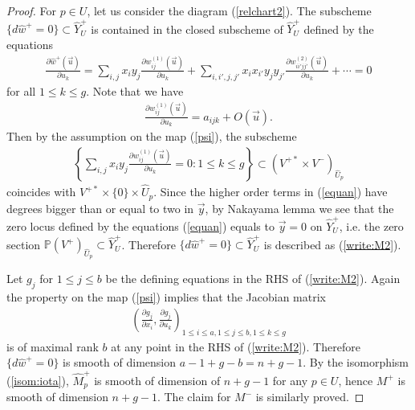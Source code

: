 \documentclass[11pt]{amsart}
\theoremstyle{plain}
\begin{document}
\begin{proof}
For $p\in U$, let us consider the diagram 
(\ref{relchart2}). 
The subscheme $\{d\widehat{w}^+=0\} \subset \widehat{Y}_U^+$
is contained in the closed subscheme of $\widehat{Y}_U^+$
defined by the equations
\begin{align}\label{equan}
\frac{\partial \widehat{w}^+(\vec{u})}{\partial u_k}
=\sum_{i, j}x_i y_j 
\frac{\partial w_{ij}^{(1)}(\vec{u})}{\partial u_k}+
\sum_{i, i', j, j'}x_i x_{i'} y_j y_{j'}
\frac{\partial w_{ii'jj'}^{(2)}(\vec{u})}{\partial u_k}
+ \cdots =0
\end{align}
for all $1\le k\le g$. 
Note that we have 
\begin{align*}
\frac{\partial w_{ij}^{(1)}(\vec{u})}{\partial u_k}
=a_{ijk} +O(\vec{u}).
\end{align*}
Then 
by the assumption on the map (\ref{psi}),
the subscheme
\begin{align*}
\left\{ \sum_{i, j}x_i y_j 
\frac{\partial w_{ij}^{(1)}(\vec{u})}{\partial u_k}=0 : 
1\le k\le g  \right\}
\subset (V^{+\ast} \times V^-)_{\widehat{U}_p}
\end{align*} 
coincides with $V^{+\ast} \times \{0\} \times \widehat{U}_p$. 
Since the higher order terms in (\ref{equan})
have degrees bigger than or equal to two in
$\vec{y}$, 
by Nakayama lemma
we see that 
the zero locus defined by the equations (\ref{equan})
equals to 
$\vec{y}=0$ on $\widehat{Y}_{U}^+$, i.e. 
the zero section 
$\mathbb{P}(V^+)_{\widehat{U}_p} \subset \widehat{Y}_{U}^+$. 
Therefore 
$\{d\widehat{w}^+=0\} \subset \widehat{Y}_U^+$ is 
described as (\ref{write:M2}). 

Let $g_j$ for $1\le j\le b$ be the defining 
equations in the RHS of (\ref{write:M2}). 
Again the property on the map (\ref{psi}) implies that the 
Jacobian matrix 
\begin{align*}
\left( \frac{\partial g_j}{\partial x_i}, \frac{\partial g_j}{\partial u_k}
 \right)_{
1\le i\le a, 1\le j\le b, 1\le k\le g}
\end{align*}
is of maximal rank $b$
at any point in the RHS of (\ref{write:M2}). 
Therefore $\{d\widehat{w}^+=0\}$ is smooth of 
dimension $a-1+g-b=n+g-1$. 
By the isomorphism (\ref{isom:iota}), $\widehat{M}_p^+$ is smooth 
of dimension of $n+g-1$ for any $p \in U$, hence 
$M^+$ is smooth of dimension $n+g-1$. 
The claim for $M^-$ is similarly proved. 
\end{proof}
\end{document}
